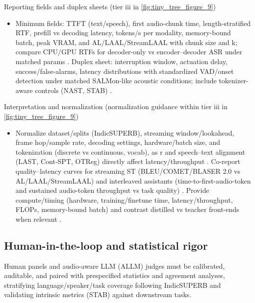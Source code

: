 Reporting fields and duplex sheets (tier iii in \autoref{fig:tiny_tree_figure_9})
\begin{itemize}
  \item Minimum fields: TTFT (text/speech), first audio-chunk time, length-stratified RTF, prefill vs decoding latency, tokens/s per modality, memory-bound batch, peak VRAM, and AL/LAAL/StreamLAAL with chunk size and k; compare CPU/GPU RTFs for decoder-only vs encoder–decoder ASR under matched params \cite{tsunoo2024decoderonlyarchitecturespeechrecognition}. Duplex sheet: interruption window, actuation delay, success/false-alarms, latency distributions with standardized VAD/onset detection under matched SALMon-like acoustic conditions; include tokenizer-aware controls (NAST, STAB) \cite{messica2024nastnoiseawarespeechtokenizationlanguage,maimon2025salmonsuiteacousticlanguagemodelevaluati,vashishth2024stabspeechtokenizerassessmentbenchmark}.
\end{itemize}

Interpretation and normalization (normalization guidance within tier iii in \autoref{fig:tiny_tree_figure_9})
\begin{itemize}
  \item Normalize dataset/splits (IndicSUPERB), streaming window/lookahead, frame hop/sample rate, decoding settings, hardware/batch size, and tokenization (discrete vs continuous, vocab), as r and speech–text alignment (LAST, Cont‑SPT, OTReg) directly affect latency/throughput \cite{turetzky2024lastlanguagemodelawarespeechtokenization,li2025continuousspeechtokenizertext,xu2025optimaltransportregularizationspeechtext}. Co-report quality–latency curves for streaming ST (BLEU/COMET/BLASER 2.0 vs AL/LAAL/StreamLAAL) and interleaved assistants (time-to-first-audio-token and sustained audio-token throughput vs task quality) \cite{maimon2025scalinganalysisinterleavedspeechtextlang,guo2025streamuniachievingstreamingspeechtransla,chen2024bestowefficientstreamablespeechlanguagem,zhao2024textlessstreamingspeechtranslationsemant}. Provide compute/timing (hardware, training/finetune time, latency/throughput, FLOPs, memory-bound batch) and contrast distilled vs teacher front-ends when relevant \cite{maimon2025slammingtrainingspeechlanguagemodelonegp}.
\end{itemize}

\subsection{Human-in-the-loop and statistical rigor} \label{subsec:Human-in-the-loop and statistical rigor}
Human panels and audio-aware LLM (ALLM) judges must be calibrated, auditable, and paired with prespecified statistics and agreement analyses, stratifying language/speaker/task coverage following IndicSUPERB and validating intrinsic metrics (STAB) against downstream tasks.

